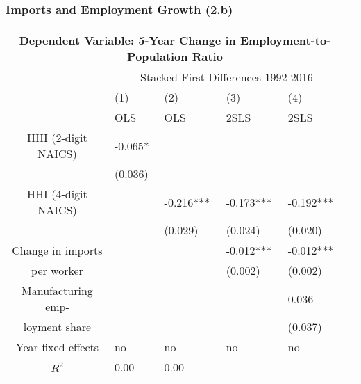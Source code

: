\documentclass[11pt]{beamer}
\begin{document}
\begin{frame}
\frametitle{Imports and Employment Growth (2.b)}
\begin{table}
  \centering 
    {\tiny \begin{tabularx}{1.0\textwidth}{ c *{5}{X} }
    \toprule
    \multicolumn{5}{c}{Dependent Variable: 5-Year Change in Employment-to-Population Ratio} \\
    \midrule
    & \multicolumn{4}{c}{Stacked First Differences 1992-2016}\\
        \cmidrule{2-5}
    & (1) & (2) & (3) & (4) \\
    & OLS & OLS & 2SLS & 2SLS \\
    \midrule
HHI (2-digit NAICS) & -0.065* \\
                                & (0.036) \\
\midrule
HHI (4-digit NAICS)& & -0.216*** & -0.173*** & -0.192*** \\
			      & & (0.029) & (0.024) & (0.020) \\
\midrule
Change in imports &  &  & -0.012*** & -0.012*** \\
per worker	     &  &  & (0.002) & (0.002) \\
\midrule
Manufacturing emp- & & & & 0.036 \\
loyment share & & & & (0.037) \\
\midrule
 Year fixed effects & no & no & no & no\\
    \midrule
    \midrule
 $R^2$ & 0.00 & 0.00 \\ %
 \bottomrule
    \end{tabularx}}
\end{table}
\end{frame}
\end{document}
